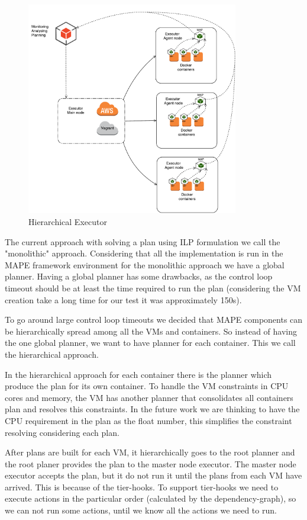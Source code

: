 \begin{figure}[ht]
  \centering
    \includegraphics[width=350px,natwidth=684,natheight=687]{./pictures/arch-hierachical}
    \caption{Hierarchical Executor}
\end{figure}

The current approach with solving a plan using ILP formulation we call the "monolithic" approach. Considering that all the implementation is run in the MAPE framework environment for the monolithic approach we have a global planner. Having a global planner has some drawbacks, as the control loop timeout should be at least the time required to run the plan (considering the VM creation take a long time for our test it was approximately 150s).

To go around large control loop timeouts we decided that MAPE components can be hierarchically spread among all the VMs and containers. So instead of having the one global planner, we want to have planner for each container. This we call the hierarchical approach.

In the hierarchical approach for each container there is the planner which produce the plan for its own container. To handle the VM constraints in CPU cores and memory, the VM has another planner that consolidates all containers plan and resolves this constraints. In the future work we are thinking to have the CPU requirement in the plan as the float number, this simplifies the constraint resolving considering each plan.

After plans are built for each VM, it hierarchically goes to the root planner and the root planer provides the plan to the master node executor. The master node executor accepts the plan, but it do not run it until the plans from each VM have arrived. This is because of the tier-hooks. To support tier-hooks we need to execute actions in the particular order (calculated by the dependency-graph), so we can not run some actions, until we know all the actions we need to run.

